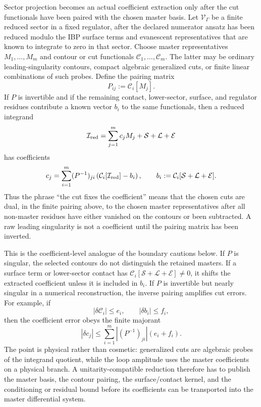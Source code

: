 \begin{controlledapproximation}
\label{ca:dual-contour-master-coefficient-extraction}
Sector projection becomes an actual coefficient extraction only after the cut
functionals have been paired with the chosen master basis.  Let
\(\mathcal V_\Gamma\) be a finite reduced sector in a fixed regulator, after
the declared numerator ansatz has been reduced modulo the IBP surface terms
and evanescent representatives that are known to integrate to zero in that
sector.  Choose master representatives \(M_1,\ldots,M_m\) and contour or cut
functionals \(\mathcal C_1,\ldots,\mathcal C_m\).  The latter may be
ordinary leading-singularity contours, compact algebraic generalized cuts, or
finite linear combinations of such probes.  Define the pairing matrix
\begin{equation}
  P_{ij}:=\mathcal C_i[M_j].
  \label{eq:dual-contour-master-pairing}
\end{equation}
If \(P\) is invertible and if the remaining contact, lower-sector, surface,
and regulator residues contribute a known vector \(b_i\) to the same
functionals, then a reduced integrand
\[
  \mathcal I_{\rm red}
  =
  \sum_{j=1}^m c_jM_j+\mathcal S+\mathcal L+\mathcal E
\]
has coefficients
\begin{equation}
  c_j
  =
  \sum_{i=1}^m
  (P^{-1})_{ji}
  \left(
    \mathcal C_i[\mathcal I_{\rm red}]-b_i
  \right),
  \qquad
  b_i:=\mathcal C_i[\mathcal S+\mathcal L+\mathcal E].
  \label{eq:dual-contour-master-coefficient}
\end{equation}
Thus the phrase ``the cut fixes the coefficient'' means that the chosen cuts
are dual, in the finite pairing above, to the chosen master representatives
after all non-master residues have either vanished on the contours or been
subtracted.  A raw leading singularity is not a coefficient until the
pairing matrix has been inverted.

This is the coefficient-level analogue of the boundary cautions below.  If
\(P\) is singular, the selected contours do not distinguish the retained
masters.  If a surface term or lower-sector contact has
\(\mathcal C_i[\mathcal S+\mathcal L+\mathcal E]\ne0\), it shifts the extracted
coefficient unless it is included in \(b_i\).  If \(P\) is invertible but
nearly singular in a numerical reconstruction, the inverse pairing amplifies
cut errors.  For example, if
\[
  |\delta\mathcal C_i|\le e_i,\qquad
  |\delta b_i|\le f_i ,
\]
then the coefficient error obeys the finite majorant
\begin{equation}
  |\delta c_j|
  \le
  \sum_{i=1}^m |(P^{-1})_{ji}|(e_i+f_i).
  \label{eq:dual-contour-master-error-majorant}
\end{equation}
The point is physical rather than cosmetic: generalized cuts are algebraic
probes of the integrand quotient, while the loop amplitude uses the master
coefficients on a physical branch.  A unitarity-compatible reduction therefore
has to publish the master basis, the contour pairing, the surface/contact
kernel, and the conditioning or residual bound before its coefficients can be
transported into the master differential system.
\end{controlledapproximation}

